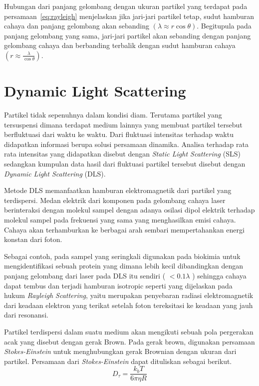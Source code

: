Hubungan dari panjang gelombang dengan ukuran partikel yang terdapat pada 
persamaan~\ref{eq:rayleigh} menjelaskan jika jari-jari partikel tetap, sudut hamburan
cahaya dan panjang gelombang akan sebanding ${\left(\lambda \approx r \cos \theta \right)}$.
Begitupula pada panjang gelombang yang sama, jari-jari partikel akan sebanding dengan
panjang gelombang cahaya dan berbanding terbalik dengan sudut hamburan cahaya 
${\left(r \approx \frac{\lambda}{\cos \theta} \right)}$.



\section{Dynamic Light Scattering}
Partikel tidak sepenuhnya dalam kondisi diam. Terutama partikel yang tersuspensi dimana terdapat
medium lainnya yang membuat partikel tersebut berfluktuasi dari waktu ke waktu. Dari fluktuasi
intensitas terhadap waktu didapatkan informasi berupa solusi persamaan dinamika. Analisa terhadap
rata rata intensitas yang didapatkan disebut dengan \textit{Static Light Scattering} (SLS) sedangkan
kumpulan data hasil dari fluktuasi partikel tersebut disebut dengan \textit{Dynamic Light Scattering}
(DLS).

Metode DLS memanfaatkan hamburan elektromagnetik dari partikel yang terdispersi. Medan elektrik
dari komponen pada gelombang cahaya laser berinteraksi dengan molekul sampel dengan adanya osilasi
dipol elektrik terhadap molekul sampel pada frekuensi yang sama yang menghasilkan emisi cahaya.
Cahaya akan terhamburkan ke berbagai arah sembari mempertahankan energi konstan dari foton. 

Sebagai contoh, pada sampel yang seringkali digunakan pada biokimia untuk mengidentifikasi sebuah
protein yang dimana lebih kecil dibandingkan dengan panjang gelombang dari laser pada DLS itu
sendiri ( $<0.1\lambda$ ) sehingga cahaya dapat tembus dan terjadi hamburan isotropic seperti yang
dijelaskan pada hukum \textit{Rayleigh Scattering}, yaitu merupakan penyebaran radiasi
elektromagnetik dari keadaan elektron yang terikat setelah foton tereksitasi ke keadaan yang jauh
dari resonansi\cite{Piazza2005}.

Partikel terdispersi dalam suatu medium akan mengikuti sebuah pola pergerakan acak yang disebut
dengan gerak Brown. Pada gerak brown, digunakan persamaan \textit{Stokes-Einstein} untuk
menghubungkan gerak Brownian dengan ukuran dari partikel\cite{Anindya2018}. Persamaan dari
\textit{Stokes-Einstein} dapat dituliskan sebagai berikut.
\begin{equation}
    D_{\tau} = \frac{k_b T}{6 \pi \eta R}
    \label{eq:stokeseinstein}
\end{equation}

